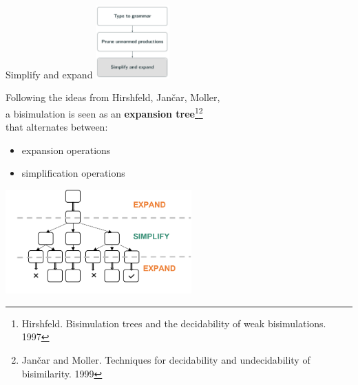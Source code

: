 \documentclass[10pt]{beamer}
\begin{document}
\begin{frame} {Simplify and expand}
	\hfill\includegraphics[height=2.8cm]{img/simplifyExpand.png}
	
	\vspace*{-3cm}
	Following the ideas from Hirshfeld, Jan{\v{c}}ar, Moller, \\
	a bisimulation is seen as an {\bf expansion tree}\footnote{Hirshfeld. Bisimulation trees and the decidability of weak bisimulations. 1997}\footnote{Jan{\v{c}}ar and Moller. Techniques for decidability and undecidability of bisimilarity. 1999}\\ that alternates between:
	\begin{itemize}
		\item { expansion operations}
		\item { simplification operations	}
	\end{itemize}
	\begin{center}
		\hspace*{-2mm}\includegraphics[height=4cm]{img/expand_simplify}
	\end{center}	
\end{frame}
\end{document}
